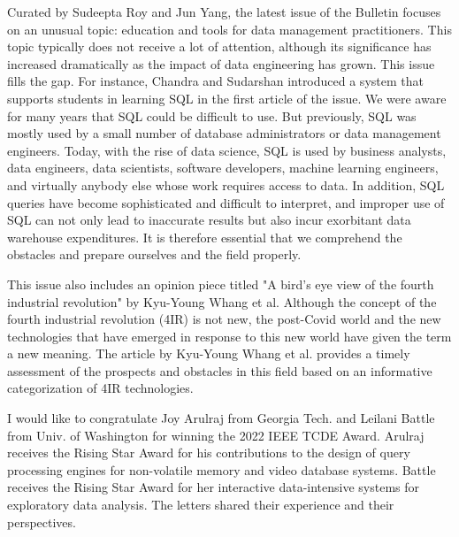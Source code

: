 \documentclass[11pt]{article}
\begin{document}
Curated by Sudeepta Roy and Jun Yang, the latest issue of the Bulletin
focuses on an unusual topic: education and tools for data management
practitioners. This topic typically does not receive a lot of
attention, although its significance has increased dramatically as the
impact of data engineering has grown. This issue fills the gap. For
instance, Chandra and Sudarshan introduced a system that supports
students in learning SQL in the first article of the issue.  We were
aware for many years that SQL could be difficult to use. But
previously, SQL was mostly used by a small number of database
administrators or data management engineers. Today, with the rise of
data science, SQL is used by business analysts, data engineers, data
scientists, software developers, machine learning engineers, and
virtually anybody else whose work requires access to data. In
addition, SQL queries have become sophisticated and difficult to
interpret, and improper use of SQL can not only lead to inaccurate
results but also incur exorbitant data warehouse expenditures. It is
therefore essential that we comprehend the obstacles and prepare
ourselves and the field properly.

This issue also includes an opinion piece titled "A bird's eye view of
the fourth industrial revolution" by Kyu-Young Whang et al. Although
the concept of the fourth industrial revolution (4IR) is not new, the
post-Covid world and the new technologies that have emerged in
response to this new world have given the term a new meaning. The
article by Kyu-Young Whang et al. provides a timely assessment of the
prospects and obstacles in this field based on an informative
categorization of 4IR technologies.

I would like to congratulate Joy Arulraj from Georgia Tech. and
Leilani Battle from Univ. of Washington for winning the 2022 IEEE TCDE
Award. Arulraj receives the Rising Star Award for his contributions to
the design of query processing engines for non-volatile memory and
video database systems.  Battle receives the Rising Star Award for her
interactive data-intensive systems for exploratory data analysis. The
letters shared their experience and their perspectives.
\end{document}
